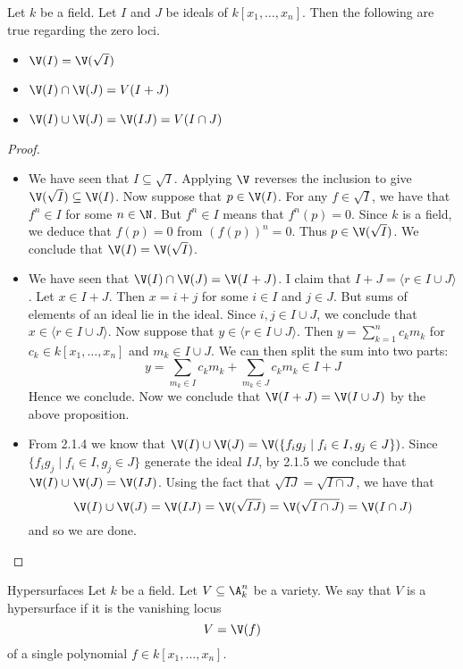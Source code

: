 \documentclass[a4paper]{article}
\begin{document}
\begin{prp}{}{} Let $k$ be a field. Let $I$ and $J$ be ideals of $k[x_1,\dots,x_n]$. Then the following are true regarding the zero loci. 
\begin{itemize}
\item $\V(I)=\V(\sqrt{I})$
\item $\V(I)\cap\V(J)=V(I+J)$
\item $\V(I)\cup\V(J)=\V(IJ)=V(I\cap J)$
\end{itemize}\tcbline
\begin{proof}~\\
\begin{itemize}
\item We have seen that $I\subseteq\sqrt{I}$. Applying $\V$ reverses the inclusion to give $\V(\sqrt{I})\subseteq\V(I)$. Now suppose that $p\in\V(I)$. For any $f\in\sqrt{I}$, we have that $f^n\in I$ for some $n\in\N$. But $f^n\in I$ means that $f^n(p)=0$. Since $k$ is a field, we deduce that $f(p)=0$ from $(f(p))^n=0$. Thus $p\in\V(\sqrt{I})$. We conclude that $\V(I)=\V(\sqrt{I})$. 
\item We have seen that $\V(I)\cap\V(J)=\V(I+J)$. I claim that $I+J=\langle r\in I\cup J\rangle$. Let $x\in I+J$. Then $x=i+j$ for some $i\in I$ and $j\in J$. But sums of elements of an ideal lie in the ideal. Since $i,j\in I\cup J$, we conclude that $x\in\langle r\in I\cup J\rangle$. Now suppose that $y\in\langle r\in I\cup J\rangle$. Then $y=\sum_{k=1}^nc_km_k$ for $c_k\in k[x_1,\dots,x_n]$ and $m_k\in I\cup J$. We can then split the sum into two parts: $$y=\sum_{m_k\in I}c_km_k+\sum_{m_k\in J}c_km_k\in I+J$$ Hence we conclude. Now we conclude that $\V(I+J)=\V(I\cup J)$ by the above proposition. 
\item From 2.1.4 we know that $\V(I)\cup\V(J)=\V(\{f_ig_j\;|\;f_i\in I, g_j\in J\})$. Since $\{f_ig_j\;|\;f_i\in I,g_j\in J\}$ generate the ideal $IJ$, by 2.1.5 we conclude that $\V(I)\cup\V(J)=\V(IJ)$. Using the fact that $\sqrt{IJ}=\sqrt{I\cap J}$, we have that $$\V(I)\cup\V(J)=\V(IJ)=\V(\sqrt{IJ})=\V(\sqrt{I\cap J})=\V(I\cap J)$$ and so we are done. 
\end{itemize}
\end{proof}
\end{prp}

\begin{defn}{Hypersurfaces}{} Let $k$ be a field. Let $V\subseteq\A_k^n$ be a variety. We say that $V$ is a hypersurface if it is the vanishing locus $$V=\V(f)$$ of a single polynomial $f\in k[x_1,\dots,x_n]$. 
\end{defn}
\end{document}
